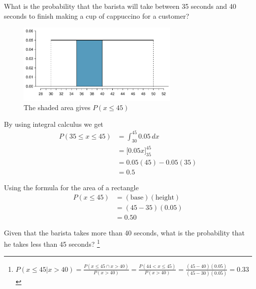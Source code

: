 \begin{example}{What is the probability that the barista will take between 35 seconds and 40 seconds to finish making a cup of cappuccino for a customer?}
\vspace{-0.25cm}
\begin{figure}[H]
\centering
\includegraphics[width=0.7\textwidth]{03/figures2/barista/barista3045/uniformBarist3045.pdf}
\caption{The shaded area gives $P(x\leq45)$ }
\label{uniformDistBarista3045}
\end{figure}
By using integral calculus we get
\begin{align*}
P(35 \leq x \leq 45)	& =	\int_{30}^{45} 0.05 \, dx		\\[1.5mm]
				& =	\big[ 0.05x \big]^{45}_{35}		\\[1.5mm]
				& =	0.05(45) - 0.05(35) 			\\[1.5mm]
				& =	0.5
\end{align*}

Using the formula for the area of a rectangle
\begin{align*}
P(x \leq 45)	& =	(\text{base})(\text{height})		\\[1.5mm]
			& =	(45-35)(0.05)				\\[1.5mm]
			& =	0.50
\end{align*}
\end{example}



\begin{exercise}
Given that the barista takes more than 40 seconds, what is the probability that he takes less than 45 seconds?
\footnote{$P(x \leq 45 | x > 40 ) 
= \frac{P(x \leq 45 \cap x > 40 )}{P(x > 40)}  
= \frac{P(44 < x \leq 45 )}{P(x > 40)}  
= \frac{(45-40)(0.05)}{(45-30)(0.05)} = 0.33 $}
\end{exercise}



